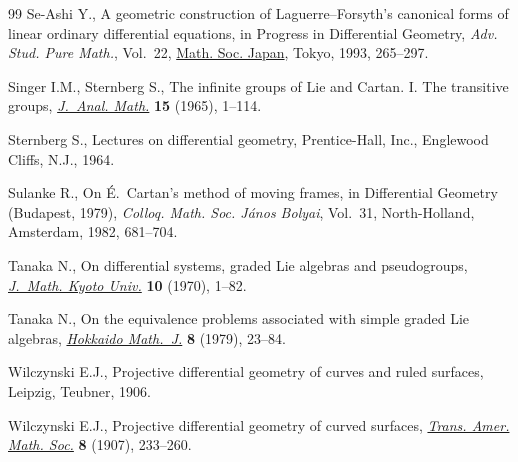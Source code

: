\begin{thebibliography}{99}
Se-Ashi Y., A geometric construction of {L}aguerre--{F}orsyth's canonical forms
 of linear ordinary differential equations, in Progress in Differential
 Geometry, \textit{Adv. Stud. Pure Math.}, Vol.~22, \href{https://doi.org/10.2969/aspm/02210265}{Math. Soc. Japan}, Tokyo,
 1993, 265--297.

Singer I.M., Sternberg S., The infinite groups of {L}ie and {C}artan. {I}.
 {T}he transitive groups, \href{https://doi.org/10.1007/BF02787690}{\textit{J.~Anal. Math.}} \textbf{15} (1965), 1--114.

Sternberg S., Lectures on differential geometry, Prentice-Hall, Inc., Englewood
 Cliffs, N.J., 1964.

Sulanke R., On \'E.~{C}artan's method of moving frames, in Differential
 Geometry ({B}udapest, 1979), \textit{Colloq. Math. Soc. J\'anos Bolyai},
 Vol.~31, North-Holland, Amsterdam, 1982, 681--704.

Tanaka N., On differential systems, graded {L}ie algebras and pseudogroups,
 \href{https://doi.org/10.1215/kjm/1250523814}{\textit{J.~Math. Kyoto Univ.}} \textbf{10} (1970), 1--82.

Tanaka N., On the equivalence problems associated with simple graded {L}ie
 algebras, \href{https://doi.org/10.14492/hokmj/1381758416}{\textit{Hokkaido Math.~J.}} \textbf{8} (1979), 23--84.

Wilczynski E.J., Projective differential geometry of curves and ruled surfaces,
 Leipzig, Teubner, 1906.

Wilczynski E.J., Projective differential geometry of curved surfaces,
 \href{https://doi.org/10.2307/1986347}{\textit{Trans. Amer. Math. Soc.}} \textbf{8} (1907), 233--260.

\end{thebibliography}
